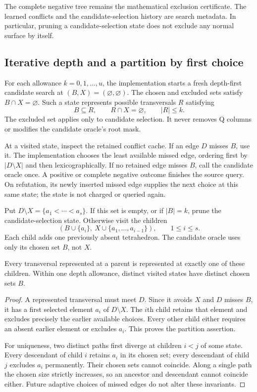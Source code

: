The complete negative tree remains the mathematical exclusion certificate.
The learned conflicts and the candidate-selection history are search
metadata.  In particular, pruning a candidate-selection state does not
exclude any normal surface by itself.

\subsection{Iterative depth and a partition by first choice}

For each allowance $k=0,1,\ldots,u$, the implementation starts a fresh
depth-first candidate search at $(B,X)=(\varnothing,\varnothing)$.
The chosen and excluded sets satisfy $B\cap X=\varnothing$.  Such a
state represents possible transversals $R$ satisfying
\[
 B\subseteq R,\qquad R\cap X=\varnothing,\qquad |R|\le k.
\]
The excluded set applies only to candidate selection.  It never removes
Q columns or modifies the candidate oracle's root mask.

At a visited state, inspect the retained conflict cache.  If an edge
$D$ misses $B$, use it.  The implementation chooses the least available
missed edge, ordering first by $|D\setminus X|$ and then
lexicographically.  If no retained edge misses $B$, call the candidate
oracle once.  A positive or complete negative outcome finishes the source
query.  On refutation, its newly inserted missed edge supplies the next
choice at this same state; the state is not charged or queried again.

Put $D\setminus X=\{a_1<\cdots<a_s\}$.  If this set is empty, or if
$|B|=k$, prune the candidate-selection state.  Otherwise visit the children
\[
 \left(B\cup\{a_i\},\ X\cup\{a_1,\ldots,a_{i-1}\}\right),
 \qquad 1\le i\le s.
\]
Each child adds one previously absent tetrahedron.  The candidate oracle
uses only its chosen set $B$, not $X$.

\begin{lemma}
\label{lem:conflict-candidate-partition}
Every transversal represented at a parent is represented at exactly one
of these children.  Within one depth allowance, distinct visited states
have distinct chosen sets $B$.
\end{lemma}
\begin{proof}
A represented transversal must meet $D$.  Since it avoids $X$ and $D$
misses $B$, it has a first selected element $a_i$ of $D\setminus X$.
The $i$th child retains that element and excludes precisely the earlier
available choices.  Every other child either requires an absent earlier
element or excludes $a_i$.  This proves the partition assertion.

For uniqueness, two distinct paths first diverge at children $i<j$ of
some state.  Every descendant of child $i$ retains $a_i$ in its chosen
set; every descendant of child $j$ excludes $a_i$ permanently.  Their
chosen sets cannot coincide.  Along a single path the chosen size strictly
increases, so an ancestor and descendant cannot coincide either.  Future
adaptive choices of missed edges do not alter these invariants.
\end{proof}


